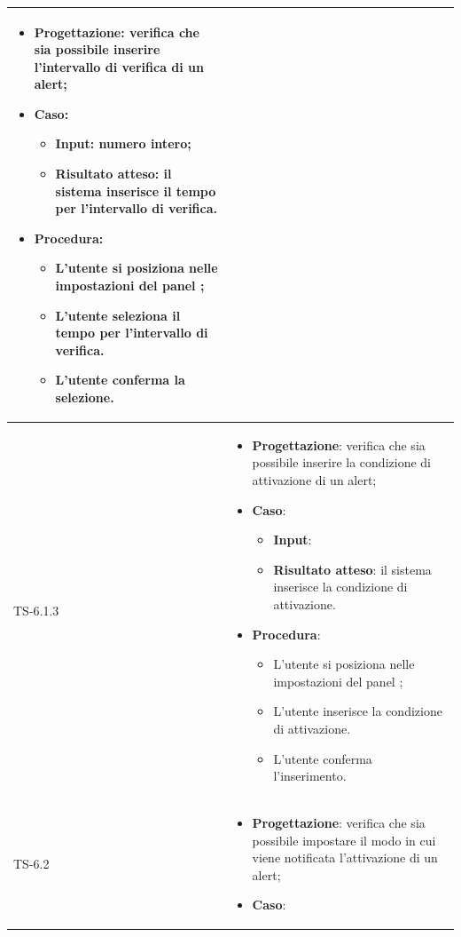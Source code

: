 \begin{longtable}{|C{2.5cm}|C{13cm}|}
\begin{itemize}
	\item \textbf{Progettazione}: verifica che sia  possibile inserire
	l'intervallo di verifica di un alert;
	\item \textbf{Caso}: 
	\begin{itemize}
		\item \textbf{Input}: numero intero;
		\item \textbf{Risultato atteso}: il sistema inserisce il tempo per l'intervallo di verifica.
	\end{itemize}
	\item \textbf{Procedura}:
	\begin{itemize}
		\item L'utente si posiziona nelle impostazioni del panel ;
		\item L'utente seleziona il tempo per l'intervallo di verifica.
		\item L'utente conferma la selezione.
	\end{itemize} 
\end{itemize}
  \\
	\hline
	{TS-6.1.3} & 
\begin{itemize}
	\item \textbf{Progettazione}: verifica che sia possibile inserire la
	condizione di attivazione di un alert;
	\item \textbf{Caso}: 
	\begin{itemize}
		\item \textbf{Input}: 
		\item \textbf{Risultato atteso}: il sistema inserisce la condizione di attivazione.
	\end{itemize}
	\item \textbf{Procedura}:
	\begin{itemize}
		\item L'utente si posiziona nelle impostazioni del panel ;
		\item L'utente inserisce la condizione di attivazione.
		\item L'utente conferma l'inserimento.
	\end{itemize} 
\end{itemize}
	 \\
	\hline
	{TS-6.2} & 
\begin{itemize}
	\item \textbf{Progettazione}: verifica che sia possibile impostare il
	modo in cui viene notificata l'attivazione di un alert;
	\item \textbf{Caso}: 
	\begin{itemize}

\end{itemize}
\end{itemize}
\end{longtable}

